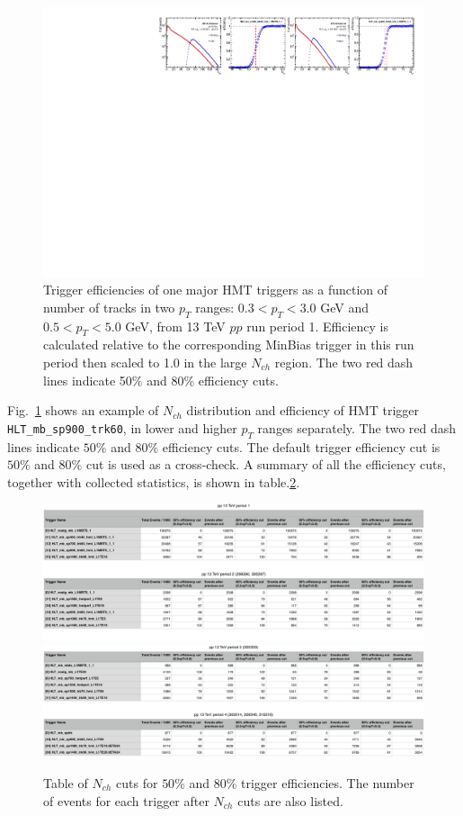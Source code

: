 \begin{figure}[H]
\centering
\includegraphics[width=1.\linewidth]{figs/sec_sys/pp13/sys_pp13_trigEff_eg.pdf}
\caption{Trigger efficiencies of one major HMT triggers as a function of number of tracks in two $p_{T}$ ranges: $0.3<p_{T}<3.0$ GeV and $0.5<p_{T}<5.0$ GeV, from 13 TeV $pp$ run period 1. Efficiency is calculated relative to the corresponding MinBias trigger in this run period then scaled to 1.0 in the large $N_{ch}$ region. The two red dash lines indicate 50$\%$ and 80$\%$ efficiency cuts.}
\label{fig:sys_pp13_trigEff_eg}
\end{figure}
Fig.~\ref{fig:sys_pp13_trigEff_eg} shows an example of $N_{ch}$ distribution and efficiency of HMT trigger \verb|HLT_mb_sp900_trk60|, in lower and higher $p_{T}$ ranges separately. The two red dash lines indicate $50\%$ and $80\%$ efficiency cuts. The default trigger efficiency cut is $50\%$ and $80\%$ cut is used as a cross-check. A summary of all the efficiency cuts, together with collected statistics, is shown in table.\ref{table:sys_pp13_trigEff_table}.
\begin{figure}[H]
\centering
\includegraphics[width=1.\linewidth]{figs/sec_sys/pp13/sys_pp13_trigEff_table_1.png}
\includegraphics[width=1.\linewidth]{figs/sec_sys/pp13/sys_pp13_trigEff_table_2.png}
\caption{Table of $N_{ch}$ cuts for $50\%$ and $80\%$ trigger efficiencies. The number of events for each trigger after $N_{ch}$ cuts are also listed.}
\label{table:sys_pp13_trigEff_table}
\end{figure}
